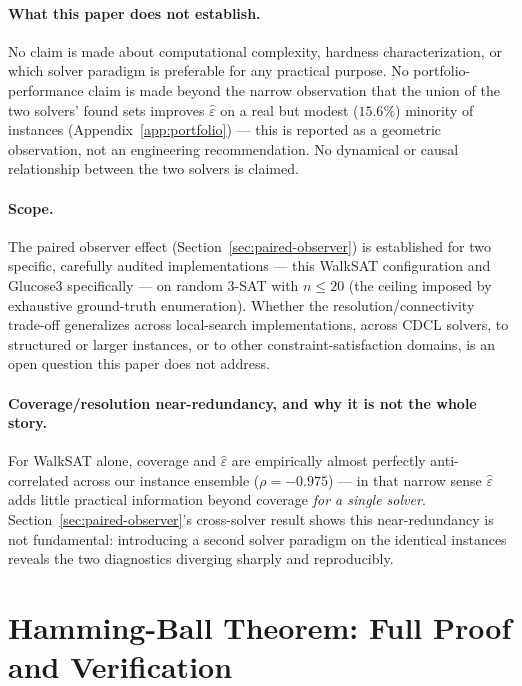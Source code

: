 \documentclass[11pt]{article}
\theoremstyle{definition}
\theoremstyle{remark}
\newcommand{\epshat}{\hat\varepsilon}
\begin{document}
\paragraph{What this paper does not establish.} No claim is made about computational complexity, hardness characterization, or which solver paradigm is preferable for any practical purpose. No portfolio-performance claim is made beyond the narrow observation that the union of the two solvers' found sets improves $\epshat$ on a real but modest ($15.6\%$) minority of instances (Appendix~\ref{app:portfolio}) --- this is reported as a geometric observation, not an engineering recommendation. No dynamical or causal relationship between the two solvers is claimed.

\paragraph{Scope.} The paired observer effect (Section~\ref{sec:paired-observer}) is established for two specific, carefully audited implementations --- this WalkSAT configuration and Glucose3 specifically --- on random 3-SAT with $n \le 20$ (the ceiling imposed by exhaustive ground-truth enumeration). Whether the resolution/connectivity trade-off generalizes across local-search implementations, across CDCL solvers, to structured or larger instances, or to other constraint-satisfaction domains, is an open question this paper does not address.

\paragraph{Coverage/resolution near-redundancy, and why it is not the whole story.} For WalkSAT alone, coverage and $\epshat$ are empirically almost perfectly anti-correlated across our instance ensemble ($\rho=-0.975$) --- in that narrow sense $\epshat$ adds little practical information beyond coverage \emph{for a single solver}. Section~\ref{sec:paired-observer}'s cross-solver result shows this near-redundancy is not fundamental: introducing a second solver paradigm on the identical instances reveals the two diagnostics diverging sharply and reproducibly.

\appendix

\section{Hamming-Ball Theorem: Full Proof and Verification}
\label{app:hamming-ball}
\end{document}
